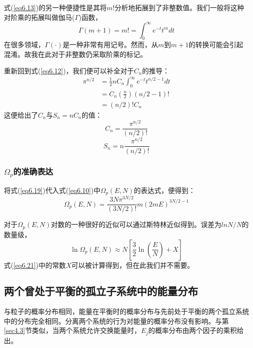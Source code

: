 \documentclass[UTF8]{ctexart}
\numberwithin{equation}{section}%
\numberwithin{figure}{section}%
\begin{document}
    式(\ref{eq6.13})的另一种便捷性是其将$m!$分析地拓展到了非整数值。我们一般将这种对阶乘的拓展叫做伽马($\Gamma$)函数，
    \begin{equation}
        \Gamma(m+1)=m !=\int_{0}^{\infty} e^{-t} t^{m} d t
        \end{equation}
    在很多领域，$\Gamma(\cdot)$是一种非常有用记号。然而，从$m$到$m+1$的转换可能会引起混淆。故我在此对于非整数仍采取阶乘的标记。

    重新回到式(\ref{eq6.12})，我们便可以补全对于$C_n$的推导：
    \begin{equation}
        \begin{aligned}
        \pi^{n / 2} &=\frac{1}{2} n C_{n} \int_{0}^{\infty} e^{-t} t^{n / 2-1} d t \\
        &=C_{n}\left(\frac{n}{2}\right)(n / 2-1) ! \\
        &=(n / 2) ! C_{n}
        \end{aligned}
        \end{equation}
    这便给出了$C_n$与$S_n=nC_n$的值：
    \begin{equation}
        C_{n}=\frac{\pi^{n / 2}}{(n / 2) !}
        \end{equation}
        \begin{equation}\label{eq6.19}
            S_{n}=n\frac{\pi^{n / 2}}{(n / 2) !}
            \end{equation}
    \subsubsection{\texorpdfstring{$\Omega_p$的准确表达}{Ωp的准确表达}}
    将式(\ref{eq6.19})代入式(\ref{eq6.10})中$\Omega_p(E,N)$的表达式，便得到：
    \begin{equation}
        \Omega_{p}(E, N)=\frac{3 N \pi^{3 N / 2}}{(3 N / 2) !} m(2 m E)^{3 N / 2-1}
        \end{equation}

    对于$\Omega_p(E,N)$对数的一种很好的近似可以通过斯特林近似得到。误差为$lnN/N$的数量级，
    \begin{equation}\label{eq6.21}
        \ln \Omega_{p}(E, N) \approx N\left[\frac{3}{2} \ln \left(\frac{E}{N}\right)+X\right]
        \end{equation}
    式(\ref{eq6.21})中的常数$X$可以被计算得到，但在此我们并不需要。
    \subsection{两个曾处于平衡的孤立子系统中的能量分布}
    与粒子的概率分布相同，能量在平衡时的概率分布与先前处于平衡的两个孤立系统中的分布完全相同。分离两个系统的行为对能量的概率分布没有影响。与第\ref{sec4.3}节类似，当两个系统允许交换能量时，$E_j$的概率分布由两个因子的乘积给出。
\end{document}
